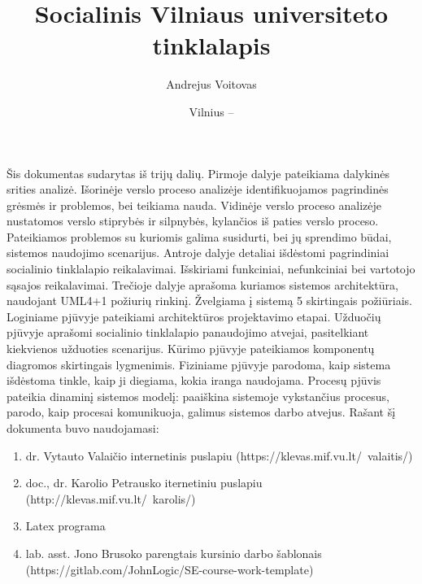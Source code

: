 \documentclass{VUMIFPSkursinis}
\title{Socialinis Vilniaus universiteto tinklalapis}
\author{Andrejus Voitovas}
\date{Vilnius – \the\year}
\begin{document}
\maketitle
\cleardoublepage{}
\setcounter{page}{2}
Šis dokumentas sudarytas iš trijų dalių. Pirmoje dalyje pateikiama dalykinės srities analizė. 
Išorinėje verslo proceso analizėje identifikuojamos pagrindinės grėsmės ir problemos, bei teikiama nauda. 
Vidinėje verslo proceso analizėje nustatomos verslo stiprybės ir silpnybės, kylančios iš paties 
verslo proceso. Pateikiamos problemos su kuriomis galima susidurti, bei jų sprendimo būdai, 
sistemos naudojimo scenarijus.
Antroje dalyje detaliai išdėstomi pagrindiniai socialinio tinklalapio reikalavimai. Išskiriami funkciniai, nefunkciniai bei vartotojo sąsajos reikalavimai.
Trečioje dalyje aprašoma kuriamos sistemos architektūra, naudojant UML4+1 požiurių rinkinį. 
Žvelgiama į sistemą 5 skirtingais požiūriais. Loginiame pjūvyje pateikiami architektūros projektavimo etapai. 
Užduočių pjūvyje aprašomi socialinio tinklalapio panaudojimo atvejai, pasitelkiant kiekvienos užduoties scenarijus.
Kūrimo pjūvyje pateikiamos komponentų diagromos skirtingais lygmenimis. Fiziniame pjūvyje parodoma, kaip sistema išdėstoma tinkle, kaip ji diegiama, kokia iranga naudojama. 
Procesų pjūvis pateikia dinaminį sistemos modelį: paaiškina sistemoje vykstančius procesus, parodo, 
kaip procesai komunikuoja, galimus sistemos darbo atvejus.
Rašant šį dokumenta buvo naudojamasi:
\begin{enumerate}
	\item dr. Vytauto Valaičio internetinis puslapiu (https://klevas.mif.vu.lt/~valaitis/) 
	\item doc., dr. Karolio Petrausko iternetiniu puslapiu (http://klevas.mif.vu.lt/~karolis/) 
	\item Latex programa
	\item lab. asst. Jono Brusoko parengtais kursinio darbo šablonais (https://gitlab.com/JohnLogic/SE-course-work-template)
	
\end{enumerate}
\newpage
\tableofcontents
\end{document}
